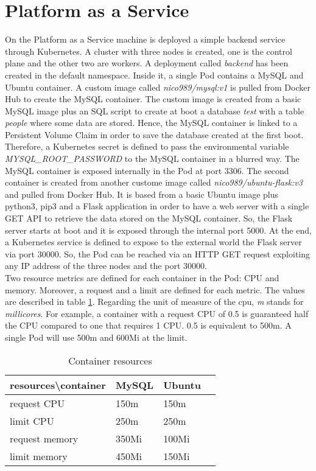\documentclass[a4paper]{article}
\begin{document}
\section{Platform as a Service}
\label{paas}
On the Platform as a Service machine is deployed a simple backend service through Kubernetes. A cluster with three nodes is created, one is the control plane and the other two are workers. A deployment called \textit{backend} has been created in the default namespace. Inside it, a single Pod contains a MySQL and Ubuntu container. A custom image called \textit{nico989/mysql:v1} is pulled from Docker Hub to create the MySQL container. The custom image is created from a basic MySQL image plus an SQL script to create at boot a database \textit{test} with a table \textit{people} where some data are stored. Hence, the MySQL container is linked to a Persistent Volume Claim in order to save the database created at the first boot. Therefore, a Kubernetes secret is defined to pass the environmental variable \textit{MYSQL\_ROOT\_PASSWORD} to the MySQL container in a blurred way. The MySQL container is exposed internally in the Pod at port 3306. The second container is created from another custome image called \textit{nico989/ubuntu-flask:v3} and pulled from Docker Hub. It is based from a basic Ubuntu image plus python3, pip3 and a Flask application in order to have a web server with a single GET API to retrieve the data stored on the MySQL container. So, the Flask server starts at boot and it is exposed through the internal port 5000. At the end, a Kubernetes service is defined to expose to the external world the Flask server via port 30000. So, the Pod can be reached via an HTTP GET request exploiting any IP address of the three nodes and the port 30000.\\
Two resource metrics are defined for each container in the Pod: CPU and memory. Moreover, a request and a limit are defined for each metric. The values are described in table \ref{res}. Regarding the unit of measure of the cpu, \textit{m} stands for \textit {millicores}. For example, a container with a request CPU of 0.5 is guaranteed half the CPU compared to one that requires 1 CPU. 0.5 is equivalent to 500m. A single Pod will use 500m and 600Mi at the limit.

\begin{table}[h]
\centering
\caption{Container resources}
\label{res}
\begin{tabular}{|l|l|l|r|}
\hline 
resources\textbackslash container & MySQL & Ubuntu\\
\hline 
request CPU & 150m & 150m \\
\hline
limit CPU & 250m & 250m \\
\hline
request memory & 350Mi & 100Mi \\
\hline
limit memory & 450Mi & 150Mi \\
\hline
\end{tabular}
\end{table}
\end{document}
